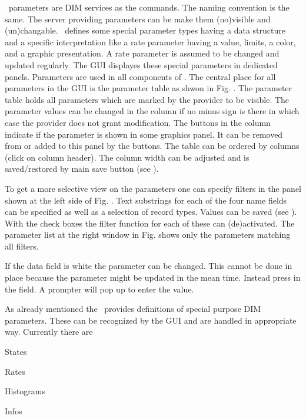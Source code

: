 {
\dabc\ parameters are DIM services as the commands. The naming convention is
the same. The server providing parameters can be make them (no)visible 
and (un)changable. \dabc\ defines some special parameter types
having a data structure and a specific interpretation like
a rate parameter having a value, limits, a color, and a graphic presentation.
A rate parameter is assumed to be changed and updated regularly.
The GUI displayes these special parameters in dedicated panels. 
Parameters are used in all components of \dabc.
The central place for all parameters in the GUI is the
parameter table as shwon in Fig. .
The parameter table holds all parameters which are marked by the provider to be visible.
The parameter values can be changed
in the  column if no minus sign is there in which case the
provider does not grant modification.
The buttons in the  column 
indicate if the parameter is shown in some graphics panel. It can be removed from or added
to this panel by the buttons.
The table can be ordered by columns (click on column header). 
The column width can be adjusted and is saved/restored by main save button
(see ).

To get a more selective view on the parameters one can specify
filters in the panel shown at the left side of Fig. . 
Text substrings for each of the four name fields
can be specified as well as a selection of record types.
Values can be saved (see ).
With the check boxes the filter function for each of these can (de)activated.
The parameter list at the right window in Fig. 
shows only the parameters matching all filters.

If the data field is white the parameter can be changed.
This cannot be done in place because the parameter might be
updated in the mean time. Instead press  in the field.
A prompter will pop up to enter the value.

As already mentioned the \dabc\ provides definitions of
special purpose DIM parameters. These 
can be recognized by the GUI and are handled in appropriate way.
Currently there are
\bcir
\item States
\item Rates
\item Histograms
\item Infos
\ecir

}

